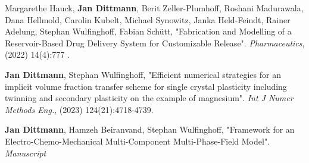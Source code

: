 \vspace{1 cm}
\begin{enumerate}[label={[\arabic*]}]
\item Margarethe Hauck, \textbf{Jan Dittmann}, Berit Zeller-Plumhoff, Roshani Madurawala, Dana Hellmold, Carolin Kubelt, Michael Synowitz, Janka Held-Feindt, Rainer Adelung, Stephan Wulfinghoff, Fabian Schütt, "Fabrication and Modelling of a Reservoir-Based Drug Delivery System for Customizable Release". \textit{Pharmaceutics}, (2022) 14(4):777 . 
\item \textbf{Jan Dittmann}, Stephan Wulfinghoff, "Efficient numerical strategies for an implicit volume fraction transfer scheme for single crystal plasticity including twinning and secondary plasticity on the example of magnesium". \textit{Int J Numer Methods Eng.}, (2023) 124(21):4718-4739.
\item \textbf{Jan Dittmann}, Hamzeh Beiranvand, Stephan Wulfinghoff, "Framework for an Electro-Chemo-Mechanical Multi-Component Multi-Phase-Field Model". \textit{Manuscript}
\end{enumerate}